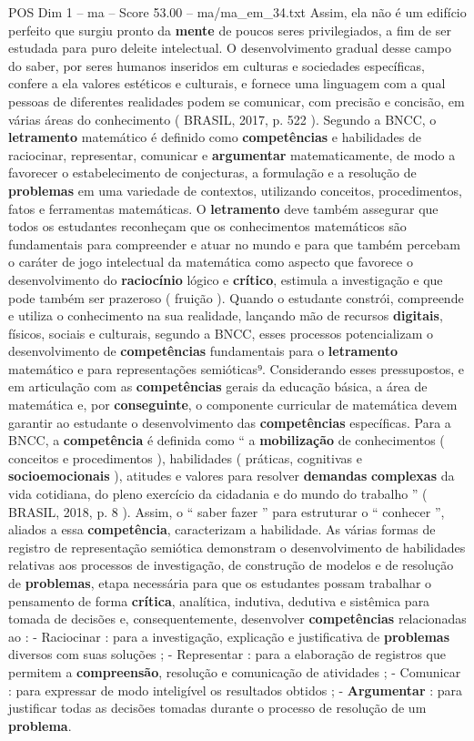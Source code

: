 \begin{textsample}{POS Dim 1 – ma – Score 53.00 – ma/ma\_em\_34.txt}
Assim, ela não é um edifício perfeito que surgiu pronto da \textbf{mente} de poucos seres privilegiados, a fim de ser estudada para puro deleite intelectual.
O desenvolvimento gradual desse campo do saber, por seres humanos inseridos em culturas e sociedades específicas, confere a ela valores estéticos e culturais, e fornece uma linguagem com a qual pessoas de diferentes realidades podem se comunicar, com precisão e concisão, em várias áreas do conhecimento ( BRASIL, 2017, p. 522 ).
Segundo a BNCC, o \textbf{letramento} matemático é definido como \textbf{competências} e habilidades de raciocinar, representar, comunicar e \textbf{argumentar} matematicamente, de modo a favorecer o estabelecimento de conjecturas, a formulação e a resolução de \textbf{problemas} em uma variedade de contextos, utilizando conceitos, procedimentos, fatos e ferramentas matemáticas.
O \textbf{letramento} deve também assegurar que todos os estudantes reconheçam que os conhecimentos matemáticos são fundamentais para compreender e atuar no mundo e para que também percebam o caráter de jogo intelectual da matemática como aspecto que favorece o desenvolvimento do \textbf{raciocínio} lógico e \textbf{crítico}, estimula a investigação e que pode também ser prazeroso ( fruição ).
Quando o estudante constrói, compreende e utiliza o conhecimento na sua realidade, lançando mão de recursos \textbf{digitais}, físicos, sociais e culturais, segundo a BNCC, esses processos potencializam o desenvolvimento de \textbf{competências} fundamentais para o \textbf{letramento} matemático e para representações semióticas⁹.
Considerando esses pressupostos, e em articulação com as \textbf{competências} gerais da educação básica, a área de matemática e, por \textbf{conseguinte}, o componente curricular de matemática devem garantir ao estudante o desenvolvimento das \textbf{competências} específicas.
Para a BNCC, a \textbf{competência} é definida como “ a \textbf{mobilização} de conhecimentos ( conceitos e procedimentos ), habilidades ( práticas, cognitivas e \textbf{socioemocionais} ), atitudes e valores para resolver \textbf{demandas} \textbf{complexas} da vida cotidiana, do pleno exercício da cidadania e do mundo do trabalho ” ( BRASIL, 2018, p. 8 ).
Assim, o “ saber fazer ” para estruturar o “ conhecer ”, aliados a essa \textbf{competência}, caracterizam a habilidade.
As várias formas de registro de representação semiótica demonstram o desenvolvimento de habilidades relativas aos processos de investigação, de construção de modelos e de resolução de \textbf{problemas}, etapa necessária para que os estudantes possam trabalhar o pensamento de forma \textbf{crítica}, analítica, indutiva, dedutiva e sistêmica para tomada de decisões e, consequentemente, desenvolver \textbf{competências} relacionadas ao : - Raciocinar : para a investigação, explicação e justificativa de \textbf{problemas} diversos com suas soluções ; - Representar : para a elaboração de registros que permitem a \textbf{compreensão}, resolução e comunicação de atividades ; - Comunicar : para expressar de modo inteligível os resultados obtidos ; - \textbf{Argumentar} : para justificar todas as decisões tomadas durante o processo de resolução de um \textbf{problema}.

\end{textsample}
